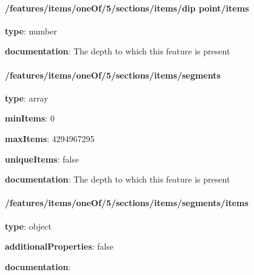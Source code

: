 \begin{itemized}
\paragraph{/features/items/oneOf/5/sections/items/dip point/items} \begin{itemized}
\item {\bf type}: number
\end{itemized}\item {\bf documentation}: The depth to which this feature is present
\end{itemized}\paragraph{/features/items/oneOf/5/sections/items/segments} \begin{itemized}
\item {\bf type}: array
\item {\bf minItems}: 0
\item {\bf maxItems}: 4294967295
\item {\bf uniqueItems}: false
\item {\bf documentation}: The depth to which this feature is present
\paragraph{/features/items/oneOf/5/sections/items/segments/items} \begin{itemized}
\item {\bf type}: object
\item {\bf additionalProperties}: false
\item {\bf documentation}: 
\end{itemized}\end{itemized}
